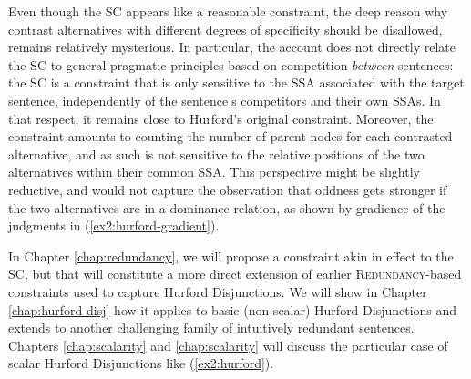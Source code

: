 Even though the SC appears like a reasonable constraint, the deep reason why contrast alternatives with different degrees of specificity should be disallowed, remains relatively mysterious. In particular, the account does not directly relate the SC to general pragmatic principles based on competition \textit{between} sentences: the SC is a constraint that is only sensitive to the SSA associated with the target sentence, independently of the sentence's competitors and their own SSAs. In that respect, it remains close to Hurford's original constraint. Moreover, the constraint amounts to counting the number of parent nodes for each contrasted alternative, and as such is not sensitive to the relative positions of the two alternatives within their common SSA. This perspective might be slightly reductive, and would not capture the observation that oddness gets stronger if the two alternatives are in a dominance relation, as shown by gradience of the judgments in (\ref{ex2:hurford-gradient}).

\begin{exe}
	\ex\label{ex2:hurford-gradient}
	\begin{xlist}
	\end{xlist}
\end{exe}


In Chapter \ref{chap:redundancy}, we will propose a constraint akin in effect to the SC, but that will constitute a more direct extension of earlier \textsc{Redundancy}-based constraints used to capture Hurford Disjunctions. We will show in Chapter \ref{chap:hurford-disj} how it applies to basic (non-scalar) Hurford Disjunctions and extends to another challenging family of intuitively redundant sentences. Chapters \ref{chap:scalarity} and \ref{chap:scalarity} will discuss the particular case of scalar Hurford Disjunctions like (\ref{ex2:hurford}).








